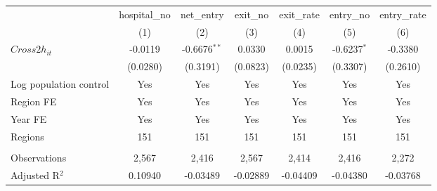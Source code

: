 \begingroup
\centering
\begin{tabular}{lcccccc}
   \toprule
                          & hospital\_no  & net\_entry     & exit\_no  & exit\_rate  & entry\_no     & entry\_rate \\    
                          & (1)           & (2)            & (3)       & (4)         & (5)           & (6)\\  
   \midrule 
   $Cross2h_{it}$         & -0.0119       & -0.6676$^{**}$ & 0.0330    & 0.0015      & -0.6237$^{*}$ & -0.3380\\   
                          & (0.0280)      & (0.3191)       & (0.0823)  & (0.0235)    & (0.3307)      & (0.2610)\\   
   Log population control & Yes           & Yes            & Yes       & Yes         & Yes           & Yes\\  
   Region FE              & Yes           & Yes            & Yes       & Yes         & Yes           & Yes\\  
   Year FE                & Yes           & Yes            & Yes       & Yes         & Yes           & Yes\\  
   Regions                & 151           & 151            & 151       & 151         & 151           & 151\\  
    \\
   Observations           & 2,567         & 2,416          & 2,567     & 2,414       & 2,416         & 2,272\\  
   Adjusted R$^2$         & 0.10940       & -0.03489       & -0.02889  & -0.04409    & -0.04380      & -0.03768\\  
   \bottomrule
\end{tabular}
\par\endgroup
